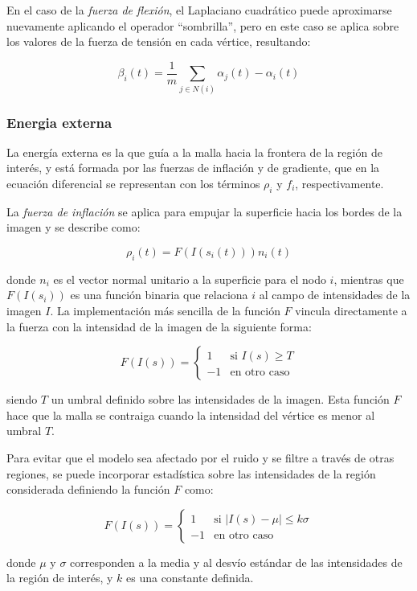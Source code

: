 En el caso de la \emph{fuerza de flexión}, el Laplaciano cuadrático puede aproximarse nuevamente aplicando el operador “sombrilla”, pero en este caso se aplica sobre los valores de la fuerza de tensión en cada vértice, resultando:

$$ \beta_{i}(t) = \dfrac{1}{m} \sum_{j\in N(i)} \alpha_{j}(t) - \alpha_{i}(t)  $$

\subsubsection{Energia externa}\label{section:energia_externa}
La energía externa es la que guía a la malla hacia la frontera de la región de interés, y está formada por las fuerzas de inflación y de gradiente, que en la ecuación diferencial se representan con los términos $\rho_{i}$ y $f_{i}$, respectivamente.

La \emph{fuerza de inflación} se aplica para empujar la superficie hacia los bordes de la imagen y se describe como: 

$$ \rho_{i}(t) = F(I(s_{i}(t))) n_{i}(t) $$

donde $n_{i}$ es el vector normal unitario a la superficie para el nodo $i$, mientras que $F(I(s_{i}))$ es una función binaria que relaciona $i$ al campo de intensidades de la imagen $I$. La implementación más sencilla de la función $F$ vincula directamente a la fuerza con la intensidad de la imagen de la siguiente forma:

$$ F(I(s)) = \begin{cases} 1 & \text{si } I(s) \geq T \\ -1 & \text{en otro caso} \end{cases}  $$

siendo $T$ un umbral definido sobre las intensidades de la imagen. Esta función $F$ hace que la malla se contraiga cuando la intensidad del vértice es menor al umbral $T$.

Para evitar que el modelo sea afectado por el ruido y se filtre a través de otras regiones, se puede incorporar estadística sobre las intensidades de la región considerada \citep{ivins1994statistical} definiendo la función $F$ como:

$$ F(I(s)) = \begin{cases} 1 & \text{si } \left|I(s) - \mu \right| \leq k\sigma \\ -1 & \text{en otro caso} \end{cases} $$

donde $\mu$ y $\sigma$ corresponden a la media y al desvío estándar de las intensidades de la región de interés, y $k$ es una constante definida.

